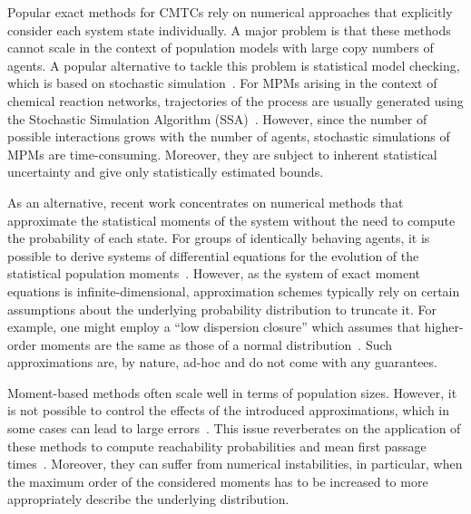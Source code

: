 Popular exact methods for CMTCs rely on numerical approaches that explicitly consider each system state individually.
A major problem is that these methods cannot scale in the context of population
models with large copy numbers of agents.
A popular alternative to tackle this problem is statistical model checking,
which is based on stochastic simulation~\cite{david2015statistical}.
For MPMs   arising in the context of chemical reaction networks, trajectories of the process are
usually generated using the Stochastic Simulation Algorithm
(SSA)~\cite{gillespie1977exact}.
However, since the number of possible interactions grows with the number of
agents, stochastic simulations of MPMs are  time-consuming. Moreover, they are
subject to inherent statistical uncertainty and give only statistically estimated bounds.

As an alternative, recent work concentrates on numerical methods that
approximate the statistical moments of the system without the need to
compute the probability of each state.
For groups of identically behaving agents, it is possible to derive systems of
differential equations
for the evolution of the statistical population
moments~\cite{bogomolov2015adaptive,schnoerr2017survey,bortolussi2013model,engblom2006computing,schnoerr2015,gast2019}.
However, as the system of exact moment equations is infinite-dimensional, approximation
schemes typically rely on certain assumptions about the
underlying probability distribution to truncate it.
For example, one might employ a ``low dispersion closure'' which assumes that
higher-order moments are the same as those of a normal
distribution~\cite{hespanha2008moment}. %
Such approximations are, by nature, ad-hoc and do not come with
any guarantees.


Moment-based methods often scale well   in terms of population sizes. However,
it is not possible to control the effects of the introduced approximations, which in some
cases can lead to large errors~\cite{schnoerr2015}.
This issue reverberates
on the application of these methods to  compute reachability
probabilities and mean first passage
times~\cite{hayden2012fluid,bortolussi2013model,bortolussi2014stochastic}.
Moreover, they can suffer from numerical instabilities, in particular, when the
maximum order of the considered moments has to be increased to more
appropriately describe the underlying distribution. %

